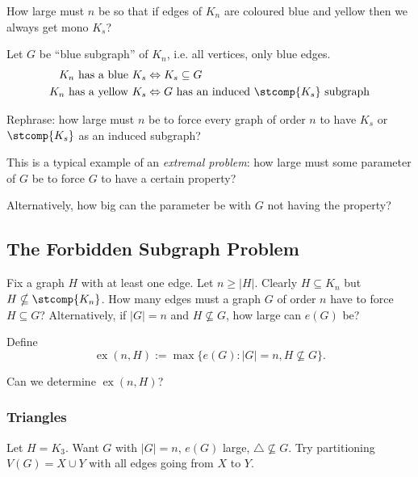 \documentclass[a4paper]{article}
\DeclareMathOperator{\exx}{ex} %
\begin{document}
\begin{question}
  How large must \(n\) be so that if edges of \(K_n\) are coloured blue and yellow then we always get mono \(K_s\)?
\end{question}

Let \(G\) be ``blue subgraph'' of \(K_n\), i.e. all vertices, only blue edges.
\begin{align*}
  K_n \text{ has a blue } K_s &\Leftrightarrow K_s \subseteq G \\
  K_n \text{ has a yellow } K_s &\Leftrightarrow G \text{ has an induced } \stcomp{K_s} \text{ subgraph}
\end{align*}

Rephrase: how large must \(n\) be to force every graph of order \(n\) to have \(K_s\) or \(\stcomp{K_s}\) as an induced subgraph?

This is a typical example of an \emph{extremal problem}: how large must some parameter of \(G\) be to force \(G\) to have a certain property?

Alternatively, how big can the parameter be with \(G\) not having the property?

\subsection{The Forbidden Subgraph Problem}

Fix a graph \(H\) with at least one edge. Let \(n \geq |H|\). Clearly \(H \subseteq K_n\) but \(H \nsubseteq \stcomp{K_n}\). How many edges must a graph \(G\) of order \(n\) have to force \(H \subseteq G\)? Alternatively, if \(|G| = n\) and \(H \nsubseteq G\), how large can \(e(G)\) be?

\begin{definition}
  Define
  \[
    \exx(n,H) := \max\{ e(G): |G|=n, H \nsubseteq G\}.
  \]
\end{definition}

\begin{question}
  Can we determine \(\exx(n,H)\)?
\end{question}

\subsubsection{Triangles}

Let \(H = K_3\). Want \(G\) with \(|G| = n\), \(e(G)\) large, \(\triangle \nsubseteq G\). Try partitioning \(V(G) = X\cup Y\) with all edges going from \(X\) to \(Y\).
\end{document}

